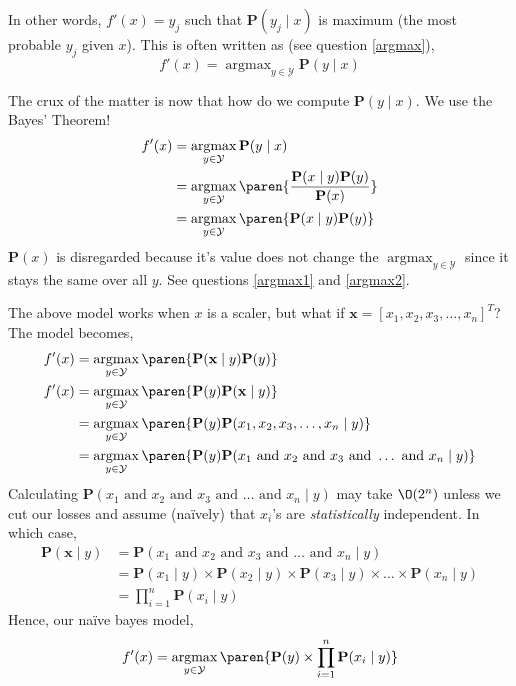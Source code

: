 \documentclass{homework}
\renewcommand\P{\mathbf{P}}
\newcommand\Y{\mathcal{Y}}
\DeclareMathOperator*{\argmax}{argmax}
\begin{document}
In other words, $f'(x) = y_j$ such that $\P(y_j \mid x)$ is maximum (the most probable $y_j$ given $x$). This is often written as (see question \ref{argmax}),
\[
  f'(x) = \argmax_{y\in \Y}\P(y\mid x)
\]

The crux of the matter is now that how do we compute $\P(y\mid x)$. We use the Bayes' Theorem!
\begin{align*}
  f'(x) & = \argmax_{y\in \Y}\P(y\mid x)                             \\
        & = \argmax_{y\in \Y}\paren{\frac{\P(x \mid y)\P(y)}{\P(x)}} \\
        & = \argmax_{y\in \Y}\paren{\P(x \mid y)\P(y)}
\end{align*}
$\P(x)$ is disregarded because it's value does not change the $\argmax_{y\in \Y}$ since it stays the same over all $y$. See questions \ref{argmax1} and \ref{argmax2}.

The above model works when $x$ is a scaler, but what if $\mathbf{x} = [x_1, x_2, x_3, \hdots, x_n]^T$? The model becomes,
\begin{align*}
  f'(x) & = \argmax_{y\in \Y}\paren{\P(\mathbf{x} \mid y)\P(y)}                                                                 \\
  f'(x) & = \argmax_{y\in \Y}\paren{\P(y)\P(\mathbf{x} \mid y)}                                                                 \\
        & = \argmax_{y\in \Y}\paren{\P(y)\P(x_1, x_2, x_3, \hdots, x_n \mid y)}                                                 \\
        & = \argmax_{y\in \Y}\paren{\P(y)\P(x_1 \text{ and } x_2 \text{ and } x_3 \text{ and } \hdots \text{ and } x_n \mid y)}
\end{align*}
Calculating $\P(x_1 \text{ and } x_2 \text{ and } x_3 \text{ and } \hdots \text{ and } x_n \mid y)$ may take $\O(2^n)$ unless we cut our losses and assume (na\"ively) that $x_i$'s are \textit{statistically} independent. In which case,
\begin{align*}
  \P(\mathbf{x}\mid y) & = \P(x_1 \text{ and } x_2 \text{ and } x_3 \text{ and } \hdots \text{ and } x_n \mid y)          \\
                       & = \P(x_1 \mid y) \times \P(x_2 \mid y) \times \P(x_3 \mid y) \times \hdots \times \P(x_n \mid y) \\
                       & = \prod_{i=1}^n\P(x_i \mid y)
\end{align*}
Hence, our na\"ive bayes model,
\[
  f'(x) = \argmax_{y\in \Y}\paren{\P(y) \times \prod_{i=1}^n\P(x_i \mid y)}
\]
\end{document}
